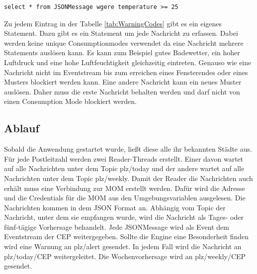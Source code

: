 \begin{lstlisting}
select * from JSONMessage wgere temperature >= 25
\end{lstlisting}
Zu jedem Eintrag in der Tabelle \ref{tab:WarningCodes} gibt es ein eigenes Statement. Dazu gibt es ein Statement um jede Nachricht zu erfassen. Dabei werden keine unique Consumptionmodes verwendet da eine Nachricht mehrere Statements auslösen kann. Es kann zum Beispiel gutes Badewetter, ein hoher Luftdruck und eine hohe Luftfeuchtigkeit gleichzeitig eintreten. Genauso wie eine Nachricht nicht im Eventstream bis zum erreichen eines Fensterendes oder eines Musters blockiert werden kann. Eine andere Nachricht kann ein neues Muster auslösen. Daher muss die erste Nachricht behalten werden und darf nicht von einen Consumption Mode blockiert werden.
\subsection{Ablauf}
Sobald die Anwendung gestartet wurde, ließt diese alle ihr bekannten Städte aus. Für jede Postleitzahl werden zwei Reader-Threads erstellt. Einer davon wartet auf alle Nachrichten unter dem Topic plz/today und der andere wartet auf alle Nachrichten unter dem Topic plz/weekly. Damit der Reader die Nachrichten auch erhält muss eine Verbindung zur MOM erstellt werden. Dafür wird die Adresse und die Credentials für die MOM aus den Umgebungsvariablen ausgelesen. Die Nachrichten kommen in dem JSON Format an. Abhängig vom Topic der Nachricht, unter dem sie empfangen wurde, wird die Nachricht als Tages- oder fünf-tägige Vorhersage behandelt. Jede JSONMessage wird als Event dem Eventstream der CEP weitergegeben. Sollte die Engine eine Besonderheit finden wird eine Warnung an plz/alert gesendet. In jedem Fall wird die Nachricht an plz/today/CEP weitergeleitet. Die Wochenvorhersage wird an plz/weekly/CEP gesendet.  
